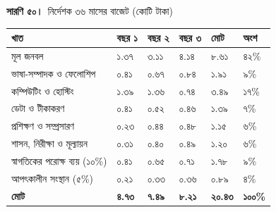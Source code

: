 \documentclass[border=10pt]{standalone}
\begin{document}
\begin{minipage}{22cm}
{\large\bfseries সারণি ৫০।}\ {\large নির্দেশক ৩৬ মাসের বাজেট (কোটি টাকা)}\par\vspace{7pt}
\small
{}
\begin{tabularx}{\linewidth}{@{}>{\hsize=2.278\hsize\raggedright\arraybackslash}X>{\hsize=0.759\hsize\raggedright\arraybackslash}X>{\hsize=0.759\hsize\raggedright\arraybackslash}X>{\hsize=0.759\hsize\raggedright\arraybackslash}X>{\hsize=0.759\hsize\raggedright\arraybackslash}X>{\hsize=0.684\hsize\raggedright\arraybackslash}X@{}}
\arrayrulecolor{bapilrule}\toprule
\rowcolor{white}\textbf{খাত} & \textbf{বছর ১} & \textbf{বছর ২} & \textbf{বছর ৩} & \textbf{মোট} & \textbf{অংশ} \\
\midrule
মূল জনবল & ১.৩৭ & ৩.১১ & ৪.১৪ & ৮.৬১ & ৪২\% \\
ভাষা-সম্পাদক ও ফেলোশিপ & ০.৪১ & ০.৬৭ & ০.৮৪ & ১.৯১ & ৯\% \\
কম্পিউটিং ও হোস্টিং & ১.৩৯ & ১.৩৬ & ০.৭৪ & ৩.৪৯ & ১৭\% \\
ডেটা ও টীকাকরণ & ০.৪১ & ০.৫২ & ০.৪৬ & ১.৩৯ & ৭\% \\
প্রশিক্ষণ ও সম্প্রসারণ & ০.২৩ & ০.৪৪ & ০.৪৮ & ১.১৫ & ৬\% \\
শাসন, নিরীক্ষা ও মূল্যায়ন & ০.৩১ & ০.৪০ & ০.৪৯ & ১.২০ & ৬\% \\
স্বাগতিকের পরোক্ষ ব্যয় (১০\%) & ০.৪১ & ০.৬৫ & ০.৭১ & ১.৭৮ & ৯\% \\
আপৎকালীন সংস্থান (৫\%) & ০.২১ & ০.৩৩ & ০.৩৬ & ০.৮৯ & ৪\% \\
\textbf{মোট} & \textbf{৪.৭৩} & \textbf{৭.৪৯} & \textbf{৮.২১} & \textbf{২০.৪৩} & \textbf{১০০\%} \\
\bottomrule
\end{tabularx}
\par{}
\par{}
\end{minipage}
\end{document}
